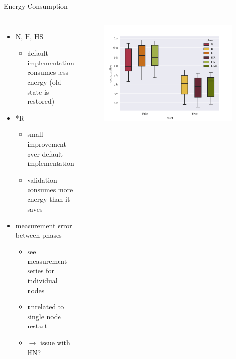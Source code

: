 \documentclass[fleqn,11pt,aspectratio=1610]{beamer}
\begin{document}
\begin{frame}{Energy Consumption}
  \begin{columns}
    \begin{itemize}
    \item<1-> N, H, HS
      \begin{itemize}
      \item default implementation consumes less energy (old state is restored)
      \end{itemize}
    \item<2-> *R
      \begin{itemize}
      \item small improvement over default implementation
      \item validation consumes more energy than it saves
      \end{itemize}
    \item<3-> measurement error between phases
      \begin{itemize}
      \item see measurement series for individual nodes
      \item unrelated to single node restart
      \item $\rightarrow$ issue with HN?
      \end{itemize}
    \end{itemize}
  \begin{figure}
    \centering
    \includegraphics[width=\textwidth]{../images/consumption-phases.pdf}
  \end{figure}
  \end{columns}
\end{frame}
\end{document}
